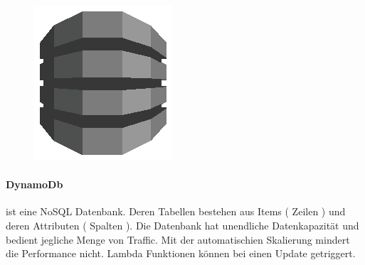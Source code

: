 \documentclass[
12pt,
english,
ngerman,
headsepline,
twoside,
openright,
numbers=noenddot,version=first
]{scrreprt}
\begin{document}
\begin{figure}
	\includegraphics[width=0.9\linewidth]{./pics/aws/Database_GRAYSCALE_AmazonDynamoDB.eps}
\end{figure}
\paragraph{DynamoDb} ist eine NoSQL Datenbank. Deren Tabellen bestehen aus Items ( Zeilen ) und deren Attributen ( Spalten ). Die Datenbank hat unendliche Datenkapazität und bedient jegliche Menge von Traffic. Mit der automatischien Skalierung mindert die Performance nicht. Lambda Funktionen können bei einen Update getriggert. 
\end{document}
